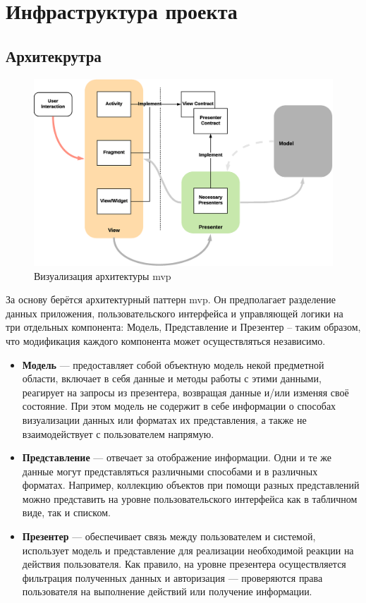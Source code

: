 \section{Инфраструктура проекта}

\subsection{Архитекрутра}
\begin{figure}[h]
    \begin{center}
        \includegraphics[scale=0.35]{images/MVP-basic.eps}
    \end{center}
    \caption{Визуализация архитектуры \acrshort{mvp}}
\end{figure}

За основу берётся архитектурный паттерн \acrshort{mvp}. Он предполагает разделение данных приложения, пользовательского интерфейса и управляющей логики на три отдельных компонента: Модель, Представление и Презентер – таким образом, что модификация каждого компонента может осуществляться независимо.

\begin{itemize}
    \item \textbf{Модель} --- предоставляет собой объектную модель некой предметной области, включает в себя данные и методы работы с этими данными, реагирует на запросы из презентера, возвращая данные и/или изменяя своё состояние. При этом модель не содержит в себе информации о способах визуализации данных или форматах их представления, а также не взаимодействует с пользователем напрямую.
    \item \textbf{Представление} --- отвечает за отображение информации. Одни и те же данные могут представляться различными способами и в различных форматах. Например, коллекцию объектов при помощи разных представлений можно представить на уровне пользовательского интерфейса как в табличном виде, так и списком.
    \item \textbf{Презентер} --- обеспечивает связь между пользователем и системой, использует модель и представление для реализации необходимой реакции на действия пользователя. Как правило, на уровне презентера осуществляется фильтрация полученных данных и авторизация — проверяются права пользователя на выполнение действий или получение информации.
\end{itemize}


